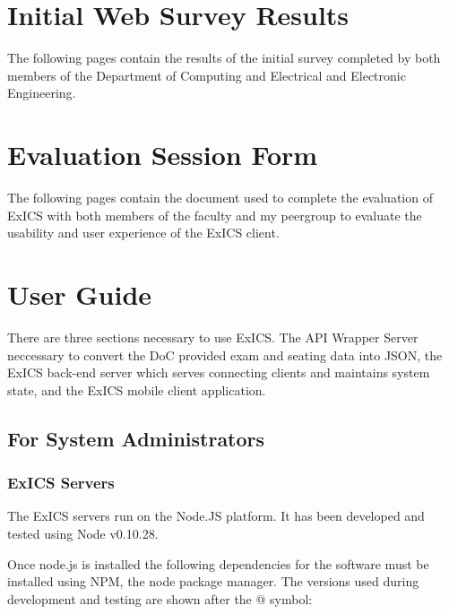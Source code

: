 \label{ch:appendix}

\chapter{Initial Web Survey Results}
\label{ch:survey_results}

The following pages contain the results of the initial survey completed by both members of the Department of Computing and Electrical and Electronic Engineering.



\chapter{Evaluation Session Form}
\label{ch:exics_eval_doc}

The following pages contain the document used to complete the evaluation of ExICS with both members of the faculty and my peergroup to evaluate the usability and user experience of the ExICS client.



\chapter{User Guide}
\label{ch:user_guide}

There are three sections necessary to use ExICS.  The API Wrapper Server neccessary to convert the DoC provided exam and seating data into JSON, the ExICS back-end server which serves connecting clients and maintains system state, and the ExICS mobile client application.

\section{For System Administrators}

\subsection{ExICS Servers}

The ExICS servers run on the Node.JS platform.  It has been developed and tested using Node v0.10.28.

Once node.js is installed the following dependencies for the software must be installed using NPM, the node package manager.  The versions used during development and testing are shown after the @ symbol:

